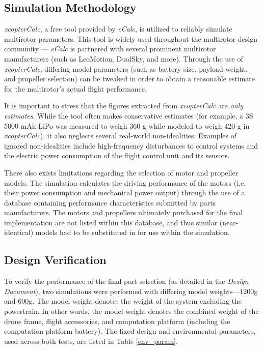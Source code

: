 \subsection{Simulation Methodology}
\textit{xcopterCalc}\cite{ecalc}, a free tool provided by \textit{eCalc}, is utilized to reliably simulate multirotor parameters. This tool is widely used throughout the multirotor design community --- \textit{eCalc} is partnered with several prominent multirotor manufacturers (such as LeoMotion, DualSky, and more)\cite{ecalcpartner}. Through the use of \textit{xcopterCalc}, differing model parameters (such as battery size, payload weight, and propeller selection) can be tweaked in order to obtain a reasonable estimate for the multirotor's actual flight performance. 

It is important to stress that the figures extracted from \textit{xcopterCalc} are \textit{only estimates}. While the tool often makes conservative estimates (for example, a 3S 5000 mAh LiPo was measured to weigh 360 g while modeled to weigh 420 g in \textit{xcopterCalc}), it also neglects several real-world non-idealities. Examples of ignored non-idealities include high-frequency disturbances to control systems and the electric power consumption of the flight control unit and its sensors. 

There also exists limitations regarding the selection of motor and propeller models. The simulation calculates the driving performance of the motors (i.e. their power consumption and mechanical power output) through the use of a database containing performance characteristics submitted by parts manufacturers. The motors and propellers ultimately purchased for the final implementation are not listed within this database, and thus similar (near-identical) models had to be substituted in for use within the simulation.

\subsection{Design Verification}
To verify the performance of the final part selection (as detailed in the \textit{Design Document}), two simulations were performed with differing model weights---1200g and 600g. The model weight denotes the weight of the system excluding the powertrain. In other words, the model weight denotes the combined weight of the drone frame, flight accessories, and computation platform (including the computation platform battery). The fixed design and environmental parameters, used across both tests, are listed in Table \ref{env_param}.

